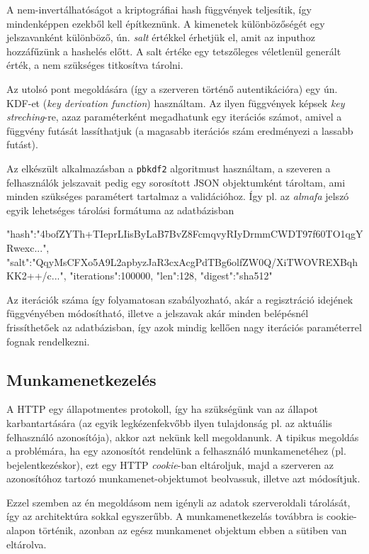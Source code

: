A nem-invertálhatóságot a kriptográfiai hash függvények teljesítik, így
mindenképpen ezekből kell építkeznünk. A kimenetek különbözőségét egy
jelszavanként különböző, ún. \emph{salt} értékkel érhetjük el, amit az inputhoz
hozzáfűzünk a hashelés előtt. A salt értéke egy tetszőleges véletlenül generált
érték, a nem szükséges titkosítva tárolni.

Az utolsó pont megoldására (így a szerveren történő autentikációra) egy ún.
KDF-et (\emph{key derivation function}) használtam. Az ilyen függvények képsek
\emph{key streching}-re, azaz paraméterként megadhatunk egy iterációs számot,
amivel a függvény futását lassíthatjuk (a magasabb iterációs szám eredményezi a
lassabb futást).

Az elkészült alkalmazásban a \texttt{pbkdf2} algoritmust használtam,
a szeveren a felhasználók jelszavait pedig egy sorosított JSON objektumként tároltam,
ami minden szükséges paramétert tartalmaz a validációhoz. Így pl. az
\emph{almafa} jelszó egyik lehetséges tárolási formátuma az adatbázisban

\begin{js}
{
  "hash":"4bofZYTh+TIeprLIisByLaB7BvZ8FcmqvyRIyDrmmCWDT97f60TO1qgYRwexc...",
  "salt":"QqyMsCFXo5A9L2apbyzJaR3cxAcgPdTBg6olfZW0Q/XiTWOVREXBqhKK2++/c...",
  "iterations":100000,
  "len":128,
  "digest":"sha512"
}
\end{js}

Az iterációk száma így folyamatosan szabályozható, akár a regisztráció idejének
függvényében módosítható, illetve a jelszavak akár minden belépésnél
frissíthetőek az adatbázisban, így azok mindig kellően nagy iterációs
paraméterrel fognak rendelkezni.

\subsection{Munkamenetkezelés}

A HTTP egy állapotmentes protokoll, így ha szükségünk van az állapot
karbantartására (az egyik legkézenfekvőbb ilyen tulajdonság pl. az aktuális
felhasználó azonosítója), akkor azt nekünk kell megoldanunk. A tipikus megoldás
a problémára, ha egy azonosítót rendelünk a felhasználó munkamenetéhez (pl.
bejelentkezéskor), ezt egy HTTP \emph{cookie}-ban eltároljuk, majd a szerveren
az azonosítóhoz tartozó munkamenet-objektumot beolvassuk, illetve azt
módosítjuk.

Ezzel szemben az én megoldásom nem igényli az adatok szerveroldali tárolását,
így az architektúra sokkal egyszerűbb. A munkamenetkezelás továbbra is
cookie-alapon történik, azonban az egész munkamenet objektum ebben a sütiben
van eltárolva.

